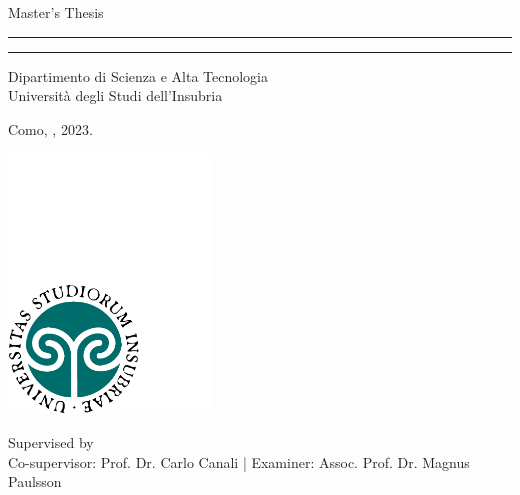  
\begin{titlepage}
\begin{center}
    
\LARGE
Master's Thesis
    
\vspace{0.5cm}
      
\rule{\textwidth}{1.5pt}
\LARGE
\textbf{\mytitle}
\rule{\textwidth}{1.5pt}
   
\vspace{0.5cm}
      
\large
Dipartimento di Scienza e Alta Tecnologia \\
Università degli Studi dell'Insubria 

\vfill

\Large
\textbf{\myname}

\vfill

\large
Como, \mydate, 2023.
      
\vfill

\includegraphics[width = 0.4\textwidth]{imgs/logo-insubria.pdf}

\vfill

\normalsize

Supervised by \mysupervisor \\
Co-supervisor: Prof. Dr. Carlo Canali | 
Examiner: Assoc. Prof. Dr. Magnus Paulsson

\end{center}
\end{titlepage}
